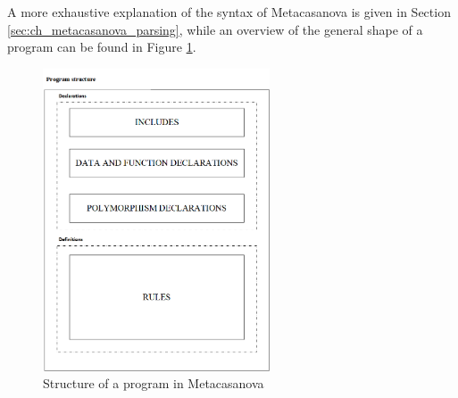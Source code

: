 \noindent
A more exhaustive explanation of the syntax of Metacasanova is given in Section \ref{sec:ch_metacasanova_parsing}, while an overview of the general shape of a program can be found in Figure \ref{fig:ch_metacasanova_program_structure}.

\begin{figure}
	\centering
	\includegraphics[width = 0.6\textwidth]{Figures/chapter_metacasanova/program_structure}
	\caption{Structure of a program in Metacasanova}
	\label{fig:ch_metacasanova_program_structure}
\end{figure}

